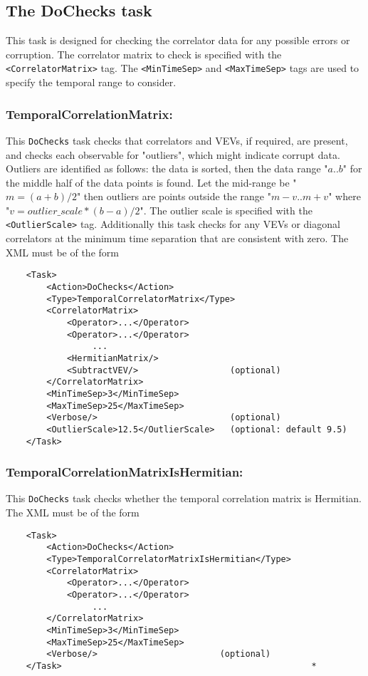 \documentclass[12pt]{article}
\newcommand{\vb}{\texttt}
\begin{document}
\subsection{The DoChecks task}

This task is designed for checking the correlator data for any possible errors
or corruption.
The correlator matrix to check is specified with the \vb{<CorrelatorMatrix>} tag.
The \vb{<MinTimeSep>} and \vb{<MaxTimeSep>} tags are used to specify the temporal
range to consider.

\subsubsection{TemporalCorrelationMatrix:}
This \vb{DoChecks} task checks that correlators and VEVs, if required, are present,
and checks each observable for "outliers", which might indicate corrupt data.
Outliers are identified as follows: the data is sorted, then the data range "$a..b$"
for the middle half of the data points is found. 
Let the mid-range be "$m=(a+b)/2$" then outliers are points outside the range
"$m-v .. m+v$"  where "$v = outlier\_scale * (b-a)/2$".
The outlier scale is specified with the \vb{<OutlierScale>} tag.
Additionally this task checks for any VEVs or diagonal correlators
at the minimum time separation that are consistent with zero.
The XML must be of the form
\begin{verbatim}
    <Task>
        <Action>DoChecks</Action>
        <Type>TemporalCorrelatorMatrix</Type>
        <CorrelatorMatrix>
            <Operator>...</Operator>
            <Operator>...</Operator>
                 ...
            <HermitianMatrix/>
            <SubtractVEV/>                  (optional)
        </CorrelatorMatrix>
        <MinTimeSep>3</MinTimeSep>
        <MaxTimeSep>25</MaxTimeSep>
        <Verbose/>                          (optional)
        <OutlierScale>12.5</OutlierScale>   (optional: default 9.5)
    </Task>  
\end{verbatim}

\subsubsection{TemporalCorrelationMatrixIsHermitian:}
This \vb{DoChecks} task checks whether the temporal correlation matrix is Hermitian.
The XML must be of the form
\begin{verbatim}
    <Task>
        <Action>DoChecks</Action>
        <Type>TemporalCorrelatorMatrixIsHermitian</Type>
        <CorrelatorMatrix>
            <Operator>...</Operator>
            <Operator>...</Operator>
                 ...
        </CorrelatorMatrix>
        <MinTimeSep>3</MinTimeSep>
        <MaxTimeSep>25</MaxTimeSep>
        <Verbose/>                        (optional) 
    </Task>    											    *
\end{verbatim}
\end{document}
